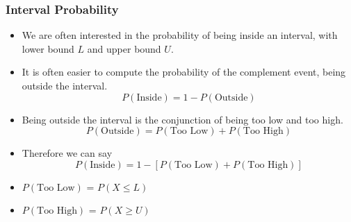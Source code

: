 \documentclass[a4]{beamer}
\begin{document}
%
%
%
%


\begin{frame}
\frametitle{Interval Probability}
\begin{itemize}
\item We are often interested in the probability of being inside an interval, with lower bound $L$ and upper bound $U$.
\item It is often easier to compute the probability of the complement event, being outside the interval.
\[ P( \mbox{Inside} ) = 1 - P( \mbox{Outside} )  \]

\item Being outside the interval is the conjunction of being too low and too high.
\[ P( \mbox{Outside} ) = P( \mbox{Too Low} ) +  P( \mbox{Too High} ) \]

\item Therefore we can say
\[ P( \mbox{Inside} ) = 1- [P( \mbox{Too Low} ) +  P( \mbox{Too High} )] \]
\item $P( \mbox{Too Low} )$ = $P( X \leq L)$
\item $P( \mbox{Too High} )$ = $P( X \geq U)$
\end{itemize}
\end{frame}
\end{document}
